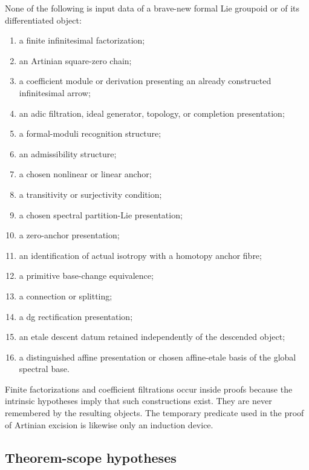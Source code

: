 None of the following is input data of a brave-new formal Lie groupoid or of
its differentiated object:
\begin{enumerate}
    \item a finite infinitesimal factorization;
    \item an Artinian square-zero chain;
    \item a coefficient module or derivation presenting an already
    constructed infinitesimal arrow;
    \item an adic filtration, ideal generator, topology, or completion
    presentation;
    \item a formal-moduli recognition structure;
    \item an admissibility structure;
    \item a chosen nonlinear or linear anchor;
    \item a transitivity or surjectivity condition;
    \item a chosen spectral partition-Lie presentation;
    \item a zero-anchor presentation;
    \item an identification of actual isotropy with a homotopy anchor fibre;
    \item a primitive base-change equivalence;
    \item a connection or splitting;
    \item a dg rectification presentation;
    \item an etale descent datum retained independently of the descended
    object;
    \item a distinguished affine presentation or chosen affine-etale basis of
    the global spectral base.
\end{enumerate}

Finite factorizations and coefficient filtrations occur inside proofs because
the intrinsic hypotheses imply that such constructions exist.  They are never
remembered by the resulting objects.  The temporary predicate used in the
proof of Artinian excision is likewise only an induction device.

\subsection{Theorem-scope hypotheses}

